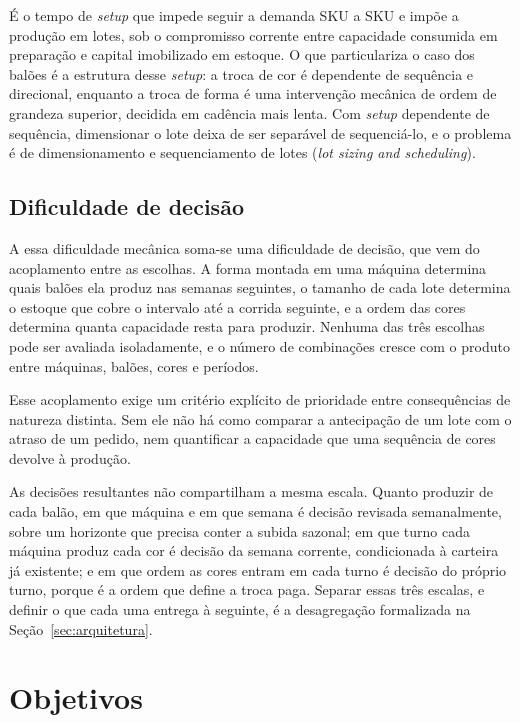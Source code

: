 \documentclass[
    12pt,
    openright,
    oneside,
    a4paper,
    fleqn,
    chapter=TITLE,
    section=TITLE,
    english,
    brazil
]{abntex2}
\begin{document}
É o tempo de \textit{setup} que impede seguir a demanda SKU a SKU e impõe a produção em lotes, sob o compromisso corrente entre capacidade consumida em preparação e capital imobilizado em estoque. O que particulariza o caso dos balões é a estrutura desse \textit{setup}: a troca de cor é dependente de sequência e direcional, enquanto a troca de forma é uma intervenção mecânica de ordem de grandeza superior, decidida em cadência mais lenta. Com \textit{setup} dependente de sequência, dimensionar o lote deixa de ser separável de sequenciá-lo, e o problema é de dimensionamento e sequenciamento de lotes (\textit{lot sizing and scheduling}).

\subsection{Dificuldade de decisão}

A essa dificuldade mecânica soma-se uma dificuldade de decisão, que vem do acoplamento entre as escolhas. A forma montada em uma máquina determina quais balões ela produz nas semanas seguintes, o tamanho de cada lote determina o estoque que cobre o intervalo até a corrida seguinte, e a ordem das cores determina quanta capacidade resta para produzir. Nenhuma das três escolhas pode ser avaliada isoladamente, e o número de combinações cresce com o produto entre máquinas, balões, cores e períodos.

Esse acoplamento exige um critério explícito de prioridade entre consequências de natureza distinta. Sem ele não há como comparar a antecipação de um lote com o atraso de um pedido, nem quantificar a capacidade que uma sequência de cores devolve à produção.

As decisões resultantes não compartilham a mesma escala. Quanto produzir de cada balão, em que máquina e em que semana é decisão revisada semanalmente, sobre um horizonte que precisa conter a subida sazonal; em que turno cada máquina produz cada cor é decisão da semana corrente, condicionada à carteira já existente; e em que ordem as cores entram em cada turno é decisão do próprio turno, porque é a ordem que define a troca paga. Separar essas três escalas, e definir o que cada uma entrega à seguinte, é a desagregação formalizada na Seção~\ref{sec:arquitetura}.

\section{Objetivos}
\label{sec:objetivo}
\end{document}
